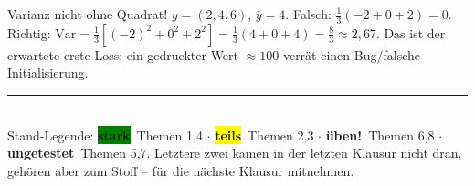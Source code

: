 \documentclass[a4paper,11pt]{article}
\newcommand{\chip}[2]{{\setlength{\fboxsep}{2.5pt}\colorbox{#1}{\color{bgdark}\footnotesize\bfseries #2}}}
\newcommand{\stark}{\chip{green}{stark}}
\newcommand{\teils}{\chip{yellow}{teils}}
\newcommand{\ueben}{\chip{rose}{üben!}}
\newcommand{\offen}{\chip{muted}{ungetestet}}
\begin{document}
\begin{rechnung}{Varianz nicht ohne Quadrat!}
$y=(2,4,6)$, $\bar y=4$. Falsch: $\tfrac13(-2+0+2)=0$. Richtig:
$\mathrm{Var}=\tfrac13[(-2)^2+0^2+2^2]=\tfrac13(4+0+4)=\tfrac83\approx2{,}67$. Das ist der erwartete
erste Loss; ein gedruckter Wert $\approx100$ verrät einen Bug/falsche Initialisierung.
\end{rechnung}

\vspace{4pt}
\noindent\textcolor{rulecol}{\rule{\linewidth}{0.4pt}}\\[2pt]
{\small\color{muted}Stand-Legende: \stark\ Themen 1,4 $\cdot$ \teils\ Themen 2,3 $\cdot$
\ueben\ Themen 6,8 $\cdot$ \offen\ Themen 5,7. Letztere zwei kamen in der letzten Klausur nicht dran,
gehören aber zum Stoff -- für die nächste Klausur mitnehmen.}
\end{document}
